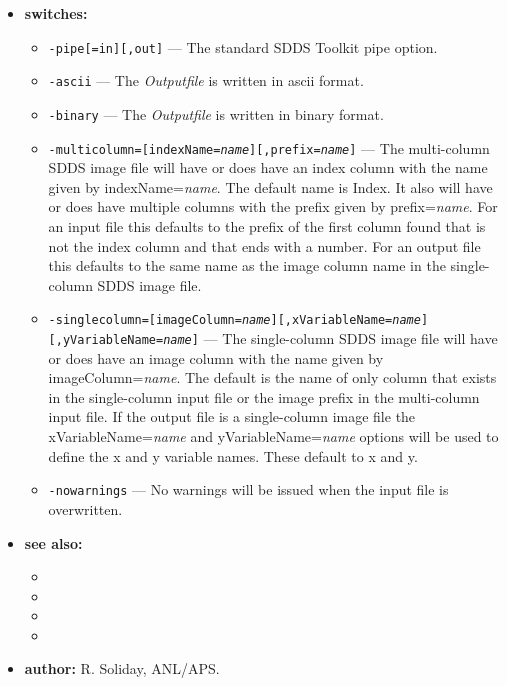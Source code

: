 \begin{itemize}
\item {\bf switches:}
    \begin{itemize}
    \item {\tt -pipe[=in][,out]} --- The standard SDDS Toolkit pipe option.
    \item {\tt -ascii} --- The {\em Outputfile} is written in ascii format.
    \item {\tt -binary} --- The {\em Outputfile} is written in binary format.
    \item {\tt -multicolumn=[indexName={\em name}][,prefix={\em name}]} --- The multi-column SDDS image file will have or does have an index column with the name given by indexName={\em name}. The default name is Index. It also will have or does have multiple columns with the prefix given by prefix={\em name}. For an input file this defaults to the prefix of the first column found that is not the index column and that ends with a number. For an output file this defaults to the same name as the image column name in the single-column SDDS image file.
    \item {\tt -singlecolumn=[imageColumn={\em name}][,xVariableName={\em name}][,yVariableName={\em name}]} --- The single-column SDDS image file will have or does have an image column with the name given by imageColumn={\em name}. The default is the name of only column that exists in the single-column input file or the image prefix in the multi-column input file. If the output file is a single-column image file the xVariableName={\em name} and yVariableName={\em name} options will be used to define the x and y variable names. These default to x and y.
    \item {\tt -nowarnings} --- No warnings will be issued when the input file is overwritten.
    \end{itemize}
\item {\bf see also:}
    \begin{itemize}
    \item {}
    \item {}
    \item {}
    \item {}
    \end{itemize}
\item {\bf author:} R. Soliday, ANL/APS.
\end{itemize}

